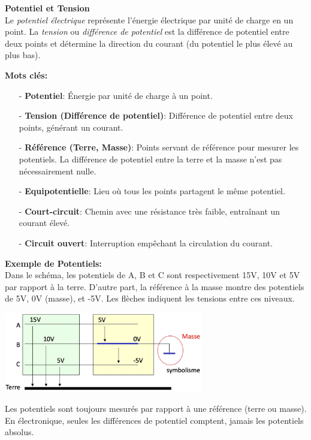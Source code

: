 \textbf{Potentiel et Tension} \\
Le \textit{potentiel électrique} représente l'énergie électrique par unité de charge en un point. La \textit{tension} ou \textit{différence de potentiel} est la différence de potentiel entre deux points et détermine la direction du courant (du potentiel le plus élevé au plus bas).

\textbf{Mots clés:}
\begin{itemize}
    \item[-] \textbf{Potentiel}: Énergie par unité de charge à un point.
    \item[-] \textbf{Tension (Différence de potentiel)}: Différence de potentiel entre deux points, générant un courant.
    \item[-] \textbf{Référence (Terre, Masse)}: Points servant de référence pour mesurer les potentiels. La différence de potentiel entre la terre et la masse n'est pas nécessairement nulle.
    \item[-] \textbf{Equipotentielle}: Lieu où tous les points partagent le même potentiel.
    \item[-] \textbf{Court-circuit}: Chemin avec une résistance très faible, entraînant un courant élevé.
    \item[-] \textbf{Circuit ouvert}: Interruption empêchant la circulation du courant.
\end{itemize}

\textbf{Exemple de Potentiels:} \\
Dans le schéma, les potentiels de A, B et C sont respectivement 15V, 10V et 5V par rapport à la terre. D'autre part, la référence à la masse montre des potentiels de 5V, 0V (masse), et -5V. Les flèches indiquent les tensions entre ces niveaux.

\begin{center}
    \includegraphics[width=0.65\textwidth]{chapters/chapter1/images/potentiels.png}
\end{center}
Les potentiels sont toujours mesurés par rapport à une référence (terre ou masse). En électronique, seules les différences de potentiel comptent, jamais les potentiels absolus.

